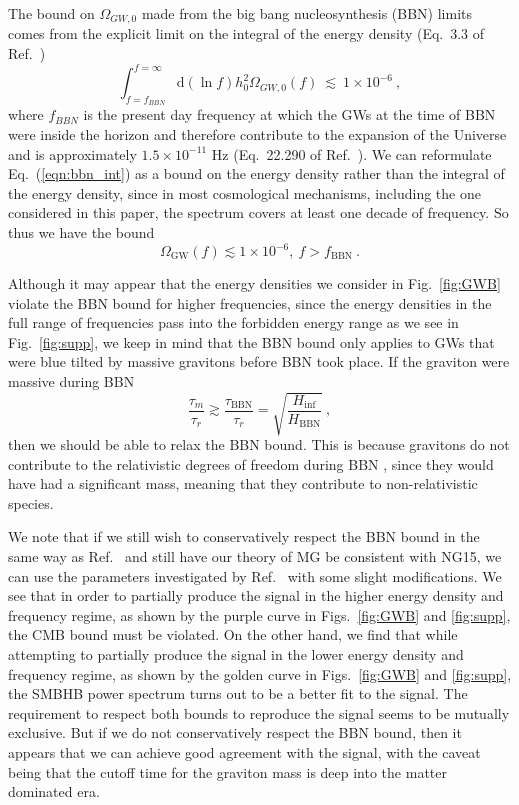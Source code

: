 \documentclass[prd,twocolumn,aps,psfig,nofootinbib,nobibnotes,superscriptaddress,preprintnumbers,times]{revtex4-2}
\newcommand{\eq}[1]{(\ref{#1})}
\begin{document}
The bound on $\Omega_{GW,0}$ made from the big bang nucleosynthesis (BBN) limits comes from the explicit limit on the integral of the energy density (Eq.\ 3.3 of Ref.\ \cite{Tanin:2020qjw}) 
\begin{equation} \label{eqn:bbn_int}
    \int_{f = f_{BBN}}^{f = \infty}\mbox{d}(\ln{f}) h_0^2\Omega_{GW,0}(f) \ \lesssim\ 1\times 10^{-6} \ ,
\end{equation} 
where $f_{BBN}$ is the present day frequency at which the GWs at the time of BBN were inside the horizon and therefore contribute to the expansion of the Universe and is approximately $1.5\times 10^{-11}$ Hz (Eq.\ 22.290 of Ref.\ \cite{Maggiore:v2}). We can reformulate Eq.\ \eq{eqn:bbn_int} as a bound on the energy density rather than the integral of the energy density, since in most cosmological mechanisms, including the one considered in this paper, the spectrum covers at least one decade of frequency. So thus we have the bound 
\begin{equation}
    \Omega_{\text{GW}}(f) \lesssim 1 \times 10^{-6},\ f > f_{\text{BBN}} \ .
\end{equation}

Although it may appear that the energy densities we consider in Fig.\ \ref{fig:GWB} violate the BBN bound for higher frequencies, since the energy densities in the full range of frequencies pass into the forbidden energy range as we see in Fig.\ \ref{fig:supp}, we keep in mind that the BBN bound only applies to GWs that were blue tilted by massive gravitons before BBN took place. If the graviton were massive during BBN 
\begin{equation}\label{eqn:massive_bbn}
    \frac{\tau_m}{\tau_r} \gtrsim \frac{\tau_{\text{BBN}}}{\tau_r} = \sqrt{\frac{H_{\inf}}{H_{\text{BBN}}}}\ ,
\end{equation}
then we should be able to relax the BBN bound. This is because gravitons do not contribute to the relativistic degrees of freedom during BBN \cite{Fujita:2018ehq}, since they would have had a significant mass, meaning that they contribute to non-relativistic species.

We note that if we still wish to conservatively respect the BBN bound in the same way as Ref.\ \cite{Fujita:2018ehq} and still have our theory of MG be consistent with NG15, we can use the parameters investigated by Ref.\ \cite{Fujita:2018ehq} with some slight modifications. We see that in order to partially produce the signal in the higher energy density and frequency regime, as shown by the purple curve in Figs.\ \ref{fig:GWB} and \ref{fig:supp}, the CMB bound must be violated. On the other hand, we find that while attempting to partially produce the signal in the lower energy density and frequency regime, as shown by the golden curve in Figs.\ \ref{fig:GWB} and \ref{fig:supp}, the SMBHB power spectrum turns out to be a better fit to the signal. The requirement to respect both bounds to reproduce the signal seems to be mutually exclusive. But if we do not conservatively respect the BBN bound, then it appears that we can achieve good agreement with the signal, with the caveat being that the cutoff time for the graviton mass is deep into the matter dominated era.
\end{document}
